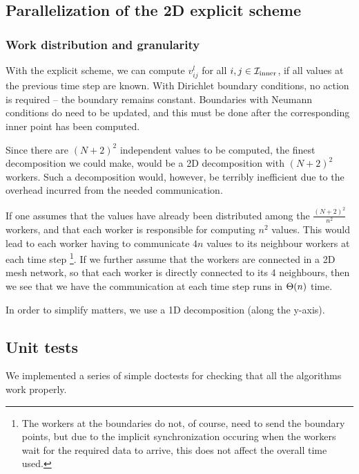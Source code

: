 \subsection{Parallelization of the 2D explicit scheme}
\subsubsection{Work distribution and granularity}
\cite{inf3380_bok}
With the explicit scheme, we can compute $v_{ij}^l$ for all $i, j \in \mathcal{I}_{\mathrm{inner}}$, if all values at the previous time step are known. With Dirichlet boundary conditions, no action is required -- the boundary remains constant. Boundaries with Neumann conditions do need to be updated, and this must be done after the corresponding inner point has been computed.

Since there are $(N+2)^2$ independent values to be computed, the finest decomposition we could make, would be a 2D decomposition with $(N+2)^2$ workers. Such a decomposition would, however, be terribly inefficient due to the overhead incurred from the needed communication.

If one assumes that the values have already been distributed among the $\frac{(N+2)^2}{n^2}$ workers, and that each worker is responsible for computing $n^2$ values. This would lead to each worker having to communicate $4n$ values to its neighbour workers at each time step \footnote{The workers at the boundaries do not, of course, need to send the boundary points, but due to the implicit synchronization occuring when the workers wait for the required data to arrive, this does not affect the overall time used.}.
If we further assume that the workers are connected in a 2D mesh network, so that each worker is directly connected to its 4 neighbours, then we see that we have the communication at each time step runs in $\Theta (n)$ time.

In order to simplify matters, we use a 1D decomposition (along the y-axis).


\subsection{Unit tests}
We implemented a series of simple doctests for checking that all the algorithms work properly.
